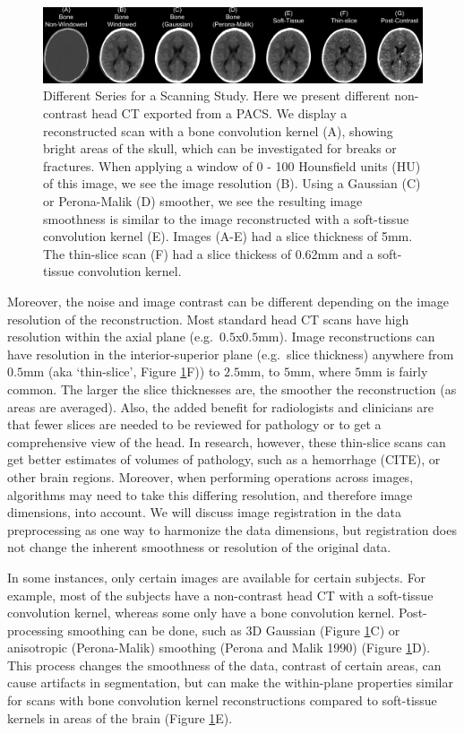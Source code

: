 \documentclass[]{elsarticle} %
\begin{document}
\begin{figure}
\includegraphics[width=1\linewidth]{overlaid_slices} \caption{Different Series for a Scanning Study.  Here we present different non-contrast head CT exported from a PACS.  We display a reconstructed scan with a bone convolution kernel (A), showing bright areas of the skull, which can be investigated for breaks or fractures.  When applying a window of 0 - 100 Hounsfield units (HU) of this image, we see the image resolution (B).  Using a Gaussian (C) or Perona-Malik (D) smoother, we see the resulting image smoothness is similar to the image reconstructed with a soft-tissue convolution kernel (E).  Images (A-E) had a slice thickness of 5mm.  The thin-slice scan (F) had a slice thickess of 0.62mm and a soft-tissue convolution kernel.}\label{fig:overlay}
\end{figure}

Moreover, the noise and image contrast can be different depending on the image resolution of the reconstruction. Most standard head CT scans have high resolution within the axial plane (e.g.~\(0.5\)x\(0.5\)mm). Image reconstructions can have resolution in the interior-superior plane (e.g.~slice thickness) anywhere from \(0.5\)mm (aka `thin-slice', Figure \ref{fig:overlay}F)) to \(2.5\)mm, to \(5\)mm, where \(5\)mm is fairly common. The larger the slice thicknesses are, the smoother the reconstruction (as areas are averaged). Also, the added benefit for radiologists and clinicians are that fewer slices are needed to be reviewed for pathology or to get a comprehensive view of the head. In research, however, these thin-slice scans can get better estimates of volumes of pathology, such as a hemorrhage (CITE), or other brain regions. Moreover, when performing operations across images, algorithms may need to take this differing resolution, and therefore image dimensions, into account. We will discuss image registration in the data preprocessing as one way to harmonize the data dimensions, but registration does not change the inherent smoothness or resolution of the original data.

In some instances, only certain images are available for certain subjects. For example, most of the subjects have a non-contrast head CT with a soft-tissue convolution kernel, whereas some only have a bone convolution kernel. Post-processing smoothing can be done, such as 3D Gaussian (Figure \ref{fig:overlay}C) or anisotropic (Perona-Malik) smoothing (Perona and Malik 1990) (Figure \ref{fig:overlay}D). This process changes the smoothness of the data, contrast of certain areas, can cause artifacts in segmentation, but can make the within-plane properties similar for scans with bone convolution kernel reconstructions compared to soft-tissue kernels in areas of the brain (Figure \ref{fig:overlay}E).
\end{document}
